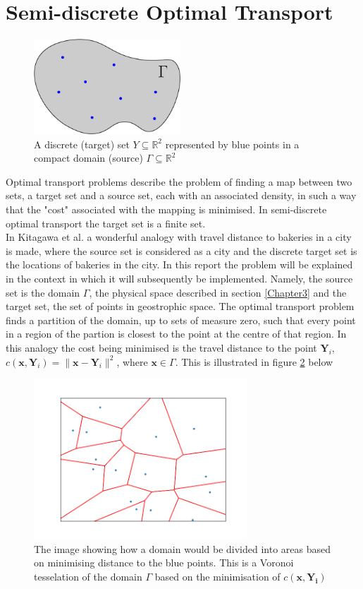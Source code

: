 \section{Semi-discrete Optimal Transport}
\begin{figure}[h]
	\centering
	\includegraphics[width=5.5cm]{project/probmeasure}
	\caption[Semi-discrete Optimal Transport]{A discrete (target) set $Y \subseteq \mathbb{R}^2$ represented by blue points in a compact domain (source) $\Gamma \subseteq \mathbb{R}^2 $}
	\label{fig:probmeasure}
\end{figure}
Optimal transport problems describe the problem of finding a map between two sets, a target set and a source set, each with an associated density, in such a way that the "cost" associated with the mapping is minimised. In semi-discrete optimal transport the target set is a finite set.\\
\linebreak
In Kitagawa et al. \cite{Kitagawa2016} a wonderful analogy with travel distance to bakeries in a city is made, where the source set is considered as a city and the discrete target set is the locations of bakeries in the city. In this report the problem will be explained in the context in which it will subsequently be implemented. Namely, the source set is the domain $\Gamma$, the physical space described in section \ref{Chapter3} and the target set, the set of points in geostrophic space. The optimal transport problem finds a partition of the domain, up to sets of measure zero, such that every point in a region of the partion is closest to the point at the centre of that region. In this analogy the cost being minimised is the travel distance to the point $\bm{Y}_i$, $c(\bm{x},\bm{Y}_i) = \|\bm{x}-\bm{Y}_i \|^2$, where $\bm{x} \in \Gamma$. This is illustrated in figure \ref{fig:laguerrediagram0w}  below
\begin{figure}[h]
	\centering
	\includegraphics[width=8cm]{project/laguerre_diagram_0w}
	\caption[The partitioning of a Domain]{The image showing how a domain would be divided into areas based on minimising distance to the blue points. This is a Voronoi tesselation of the domain $\Gamma$ based on the minimisation of $c(\bm{x},\bm{Y_i})$}
	\label{fig:laguerrediagram0w}
\end{figure}
